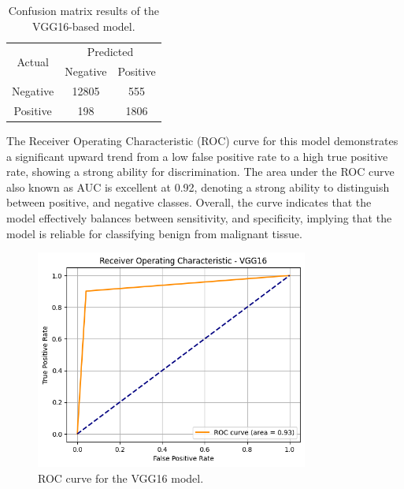 \documentclass[../main]{subfiles}
\begin{document}
\begin{table}[h!]
    \centering
    \begin{tabular}{|c|c|c|}
        \hline
        \multirow{2}{*}{Actual} & \multicolumn{2}{c|}{Predicted} \\ \cline{2-3}
                                & Negative         & Positive         \\ \hline
        Negative                & 12805            & 555              \\ \hline
        Positive                & 198              & 1806              \\ \hline
    \end{tabular}
    \caption{Confusion matrix results of the VGG16-based model.}
    \label{tab:confusion-matrix-vgg16}
\end{table}

\noindent The Receiver Operating Characteristic (ROC) curve for this model demonstrates a significant upward trend from a low false positive rate to a high true positive rate, showing a strong ability for discrimination. The area under the ROC curve also known as AUC is excellent at 0.92, denoting a strong ability to distinguish between positive, and negative classes. Overall, the curve indicates that the model effectively balances between sensitivity, and specificity, implying that the model is reliable for classifying benign from malignant tissue.

\begin{figure}[h!]
	\centering
	\includegraphics[width=0.8\textwidth]{assets/roc_vgg16.png}
	\caption{ROC curve for the VGG16 model.}
    \label{fig:roc-vgg16}
\end{figure}

\clearpage
\end{document}
